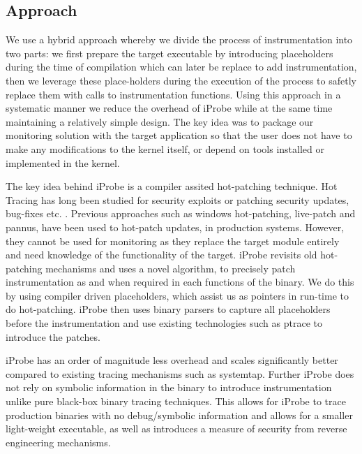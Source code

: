 \subsection{Approach}


We use a hybrid approach whereby we divide the process of instrumentation into two parts: we first prepare the target executable by introducing placeholders during the time of compilation which can later be replace to add instrumentation, then we leverage these place-holders during the execution of the process to safetly replace them with calls to instrumentation functions. Using this approach in a systematic manner we reduce the overhead of iProbe while at the same time maintaining a relatively simple design. The key idea was to package our monitoring solution with the target application so that the user does not have to make any modifications to the kernel itself, or depend on tools installed or implemented in the kernel.


The key idea behind iProbe is a compiler assited hot-patching technique. Hot Tracing has long been studied for security exploits or patching security updates, bug-fixes etc. \cite{katana}. Previous approaches such as windows hot-patching, live-patch and pannus\cite{pannus}, have been used to hot-patch updates, in production systems. However, they cannot be used for monitoring as they replace the target module entirely and need knowledge of the functionality of the target. iProbe revisits old hot-patching mechanisms and uses a novel algorithm, to precisely patch instrumentation as and when required in each functions of the binary. We do this by using compiler driven placeholders, which assist us as pointers in run-time to do hot-patching. iProbe then uses binary parsers to capture all placeholders before the instrumentation and use existing technologies such as ptrace \cite{ptrace} to introduce the patches.


iProbe has an order of magnitude less overhead and scales significantly better compared to existing tracing mechanisms such as systemtap\cite{systemtap}. Further iProbe does not rely on symbolic information in the binary to introduce instrumentation unlike pure black-box binary tracing techniques. This allows for iProbe to trace production binaries with no debug/symbolic information and allows for a smaller light-weight executable, as well as introduces a measure of security from reverse engineering mechanisms.



